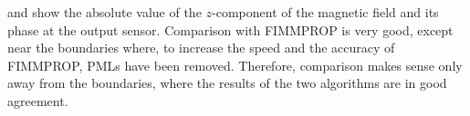  and 
show the absolute value of the $z$-component of the magnetic field and
its phase at the output sensor. Comparison with FIMMPROP is very good,
except near the boundaries where, to increase the speed and the
accuracy of FIMMPROP, PMLs have been removed. Therefore, comparison makes sense
only away from the boundaries, where the results of the two
algorithms are in good agreement.

















